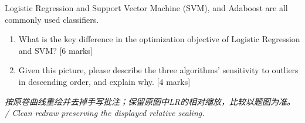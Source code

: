 Logistic Regression and Support Vector Machine (SVM), and Adaboost are all commonly used classifiers.



\begin{enumerate}[start=1]

\item What is the key difference in the optimization objective of Logistic Regression and SVM? [6 marks]

\item Given this picture, please describe the three algorithms' sensitivity to outliers in descending order, and explain why. [4 marks]

\end{enumerate}




\emph{按原卷曲线重绘并去掉手写批注；保留原图中LR的相对缩放，比较以题图为准。 / Clean redraw preserving the displayed relative scaling.}
